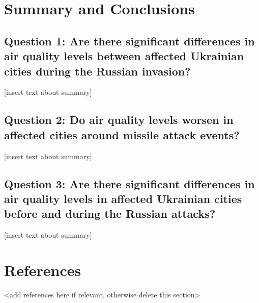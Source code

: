 \documentclass[
  12pt,
]{article}
\begin{document}
\newpage

\hypertarget{summary-and-conclusions}{%
\section{Summary and Conclusions}\label{summary-and-conclusions}}

\hypertarget{question-1-are-there-significant-differences-in-air-quality-levels-between-affected-ukrainian-cities-during-the-russian-invasion-1}{%
\subsection{Question 1: Are there significant differences in air quality
levels between affected Ukrainian cities during the Russian
invasion?}\label{question-1-are-there-significant-differences-in-air-quality-levels-between-affected-ukrainian-cities-during-the-russian-invasion-1}}

{[}insert text about summary{]}

\hypertarget{question-2-do-air-quality-levels-worsen-in-affected-cities-around-missile-attack-events-1}{%
\subsection{Question 2: Do air quality levels worsen in affected cities
around missile attack
events?}\label{question-2-do-air-quality-levels-worsen-in-affected-cities-around-missile-attack-events-1}}

{[}insert text about summary{]}

\hypertarget{question-3-are-there-significant-differences-in-air-quality-levels-in-affected-ukrainian-cities-before-and-during-the-russian-attacks-1}{%
\subsection{Question 3: Are there significant differences in air quality
levels in affected Ukrainian cities before and during the Russian
attacks?}\label{question-3-are-there-significant-differences-in-air-quality-levels-in-affected-ukrainian-cities-before-and-during-the-russian-attacks-1}}

{[}insert text about summary{]}

\newpage

\hypertarget{references}{%
\section{References}\label{references}}

\textless add references here if relevant, otherwise delete this
section\textgreater{}
\end{document}

